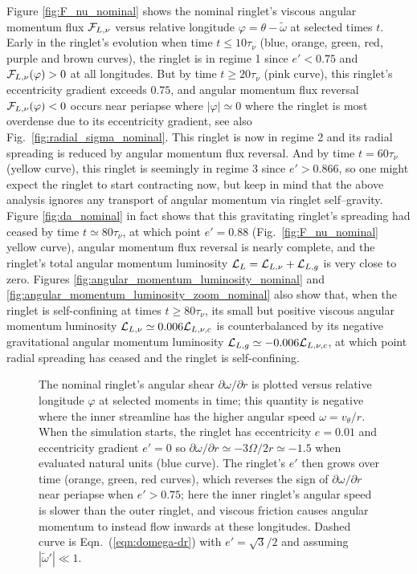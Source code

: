 \documentclass[preprint]{aastex62}
\begin{document}
Figure \ref{fig:F_nu_nominal} shows the nominal ringlet's viscous angular momentum flux
${\cal F}_{L,\nu}$ versus relative longitude $\varphi=\theta-\tilde{\omega}$ at selected times $t$.
Early in the ringlet's evolution when time $t \le 10\tau_\nu$ (blue, orange, green, red, purple 
and brown curves),
the ringlet is in regime 1 since $e'<0.75$ and ${\cal F}_{L,\nu}(\varphi)>0$ at all longitudes.
But by time $t \ge 20\tau_\nu$ (pink curve), this ringlet's eccentricity gradient exceeds $0.75$,
and angular momentum flux reversal ${\cal F}_{L,\nu}(\varphi)<0$ occurs near periapse where $|\varphi|\simeq0$
where the ringlet is most overdense due to its eccentricity gradient, see 
also Fig.\ \ref{fig:radial_sigma_nominal}.
This ringlet is now in regime 2 and its radial spreading is reduced by angular momentum flux reversal. 
And by time $t = 60\tau_\nu$ (yellow curve), this ringlet is seemingly in regime 3
since $e'>0.866$, so one might expect the ringlet to start contracting
now, but keep in mind that the above analysis ignores any transport
of angular momentum via ringlet self--gravity. Figure \ref{fig:da_nominal} in fact
shows that this gravitating ringlet's spreading had ceased by time $t \simeq80\tau_\nu$, 
at which point $e'=0.88$ (Fig.\ \ref{fig:F_nu_nominal} yellow curve), angular momentum flux reversal is nearly complete,
and the ringlet's total angular momentum luminosity ${\cal L}_L={\cal L}_{L,\nu}+{\cal L}_{L,g}$ is very close to zero.
Figures \ref{fig:angular_momentum_luminosity_nominal} and \ref{fig:angular_momentum_luminosity_zoom_nominal} also show that, 
when the ringlet is self-confining at times $t\ge 80\tau_\nu$, 
its small but positive viscous angular momentum luminosity ${\cal L}_{L,\nu}\simeq0.006{\cal L}_{L,\nu,c}$ 
is counterbalanced by its negative gravitational angular momentum luminosity ${\cal L}_{L,g}\simeq -0.006{\cal L}_{L,\nu,c}$,
at which point radial spreading has ceased and the ringlet is self-confining. 

\begin{figure}
    \caption{
        \label{fig:nominal_shear}
        The nominal ringlet's angular shear $\partial\omega/\partial r$ is plotted versus relative 
        longitude $\varphi$ at selected moments in time; this quantity is negative where the inner streamline
        has the higher angular speed $\omega=v_\theta/r$. When the simulation starts, the
        ringlet has eccentricity $e=0.01$ and eccentricity gradient $e'=0$ 
        so $\partial\omega/\partial r\simeq-3\Omega/2r\simeq-1.5$ when evaluated natural units (blue curve).
        The ringlet's $e'$ then grows over time (orange, green, red curves),
        which reverses the sign of $\partial\omega/\partial r$
        near periapse when $e'>0.75$; here the inner ringlet's angular speed
        is slower than the outer ringlet, and viscous friction causes angular momentum to instead flow inwards
        at these longitudes. Dashed curve is Eqn.\ (\ref{eqn:domega-dr}) with $e'=\sqrt{3}/2$
        and assuming $|\tilde{\omega}'|\ll1$.
    }
\end{figure}
\end{document}
